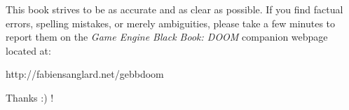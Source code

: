 This book strives to be as accurate and as clear as possible. If you find factual errors, spelling mistakes, or merely ambiguities, please take a few minutes to report them on the \textit{Game Engine Black Book: DOOM} companion webpage located at:\\
\par
http://fabiensanglard.net/gebbdoom\\
\par
Thanks :) !
